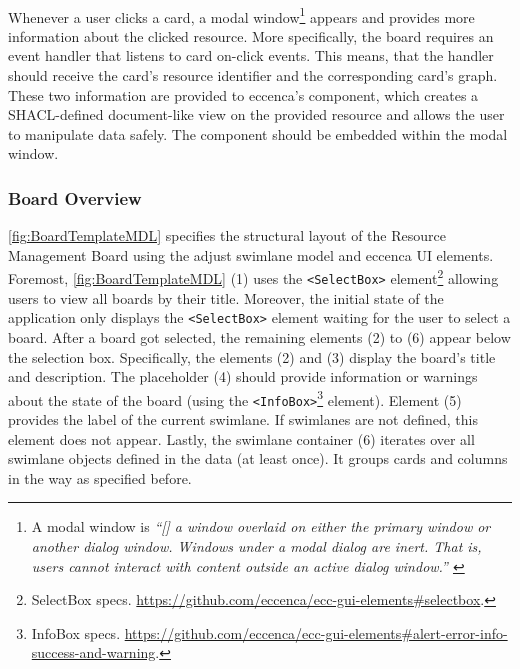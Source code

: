 \paragraph{} Whenever a user clicks a card, a modal window\footnote{A modal window is \textit{“[\textellipsis{}] a window overlaid on either the primary window or another dialog window. Windows under a modal dialog are inert. That is, users cannot interact with content outside an active dialog window.” \parencite{W3CDialog2015}}} appears and provides more information about the clicked resource. More specifically, the board requires an event handler that listens to card on-click events. This means, that the handler should receive the card’s resource identifier and the corresponding card’s graph. These two information are provided to eccenca’s  component, which creates a \acrshort*{SHACL}-defined document-like view on the provided resource and allows the user to manipulate data safely. The  component should be embedded within the modal window.



\subsubsection{Board Overview}

\autoref{fig:BoardTemplateMDL} specifies the structural layout of the Resource Management Board using the adjust swimlane model and eccenca \acrshort*{UI} elements. Foremost, \autoref{fig:BoardTemplateMDL} (1) uses the \texttt{<SelectBox>} element\footnote{SelectBox specs. \url{https://github.com/eccenca/ecc-gui-elements\#selectbox}.} allowing users to view all boards by their title. Moreover, the initial state of the application only displays the \texttt{<SelectBox>} element waiting for the user to select a board. After a board got selected, the remaining elements (2) to (6) appear below the selection box. Specifically, the elements (2) and (3) display the board’s title and description. The placeholder (4) should provide information or warnings about the state of the board (using the \texttt{<InfoBox>}\footnote{InfoBox specs. \url{https://github.com/eccenca/ecc-gui-elements\#alert-error-info-success-and-warning}.} element). Element (5) provides the label of the current swimlane. If swimlanes are not defined, this element does not appear. Lastly, the swimlane container (6) iterates over all swimlane objects defined in the data (at least once). It groups cards and columns in the way as specified before.


